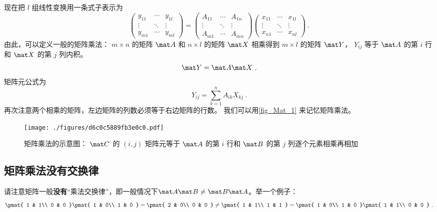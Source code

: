 现在把 $l$ 组线性变换用一条式子表示为
\begin{equation}
\begin{pmatrix}
y_{11} & \cdots & y_{1l} \\
 \vdots & \ddots & \vdots \\
y_{m1} & \cdots & y_{ml}
\end{pmatrix}
=
\begin{pmatrix}
A_{11} & \cdots & A_{1n} \\
 \vdots & \ddots & \vdots \\
A_{m1} & \cdots & A_{mn}
\end{pmatrix}
\begin{pmatrix}
x_{11} & \cdots & x_{1l} \\
 \vdots & \ddots & \vdots \\
x_{n1} & \cdots & x_{nl}
\end{pmatrix}~.
\end{equation}
由此，可以定义一般的矩阵乘法： $m \times n$ 的矩阵 $\mat A$ 和 $n \times l$ 的矩阵 $\mat X$ 相乘得到 $m \times l$ 的矩阵 $\mat Y$，  $Y_{ij}$ 等于 $\mat A$ 的第 $i$ 行和 $\mat X$ 的第 $j$ 列内积。
\begin{equation}
\mat Y=\mat A\mat X~.
\end{equation}
矩阵元公式为
\begin{equation}
Y_{ij} = \sum_{k = 1}^n A_{ik} X_{kj}~.
\end{equation}
再次注意两个相乘的矩阵，左边矩阵的列数必须等于右边矩阵的行数。 我们可以用\autoref{fig_Mat_1} 来记忆矩阵乘法。

\begin{figure}[ht]
\centering
\texttt{[image: ./figures/d6c0c5889fb3e0c0.pdf]}
\caption{矩阵乘法的示意图： $\mat C$ 的 $(i, j)$ 矩阵元等于 $\mat A$ 的第 $i$ 行和 $\mat B$ 的第 $j$ 列逐个元素相乘再相加} \label{fig_Mat_1}
\end{figure}

\subsection{矩阵乘法没有交换律}
请注意矩阵一般\textbf{没有}“乘法交换律”，即一般情况下$\mat A \mat B \ne \mat B \mat A$。举一个例子：
\begin{equation}
\pmat{ 1 & 1\\ 0 & 0 }
\pmat{ 1 & 0\\ 1 & 0 } =
\pmat{ 2 & 0\\ 0 & 0 } \ne
\pmat{ 1 & 1\\ 1 & 1 } =
\pmat{ 1 & 0\\ 1 & 0 }
\pmat{ 1 & 1\\ 0 & 0 }~.
\end{equation}

